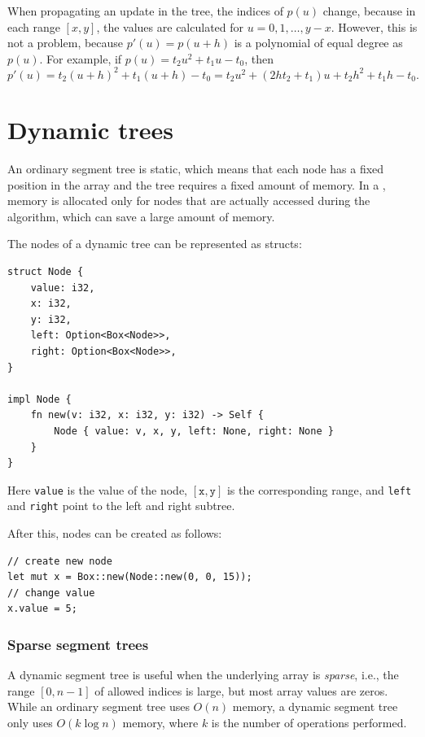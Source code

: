 When propagating an update in the tree,
the indices of $p(u)$ change,
because in each range $[x,y]$,
the values are
calculated for $u=0,1,\ldots,y-x$.
However, this is not a problem, because
$p'(u)=p(u+h)$ is a polynomial
of equal degree as $p(u)$.
For example, if $p(u)=t_2 u^2+t_1 u-t_0$, then
\[p'(u)=t_2(u+h)^2+t_1(u+h)-t_0=t_2 u^2 + (2ht_2+t_1)u+t_2h^2+t_1h-t_0.\]

\section{Dynamic trees}


An ordinary segment tree is static,
which means that each node has a fixed position
in the array and the tree requires
a fixed amount of memory.
In a ,
memory is allocated only for nodes that
are actually accessed during the algorithm,
which can save a large amount of memory.

The nodes of a dynamic tree can be represented as structs:
\begin{lstlisting}
struct Node {
    value: i32,
    x: i32,
    y: i32,
    left: Option<Box<Node>>,
    right: Option<Box<Node>>,
}

impl Node {
    fn new(v: i32, x: i32, y: i32) -> Self {
        Node { value: v, x, y, left: None, right: None }
    }
}
\end{lstlisting}
Here \texttt{value} is the value of the node,
$[\texttt{x},\texttt{y}]$ is the corresponding range,
and \texttt{left} and \texttt{right} point to the left
and right subtree.

After this, nodes can be created as follows:
\begin{lstlisting}
// create new node
let mut x = Box::new(Node::new(0, 0, 15));
// change value
x.value = 5;
\end{lstlisting}

\subsubsection{Sparse segment trees}


A dynamic segment tree is useful when
the underlying array is \emph{sparse},
i.e., the range $[0,n-1]$
of allowed indices is large,
but most array values are zeros.
While an ordinary segment tree uses $O(n)$ memory,
a dynamic segment tree only uses $O(k \log n)$ memory,
where $k$ is the number of operations performed.

